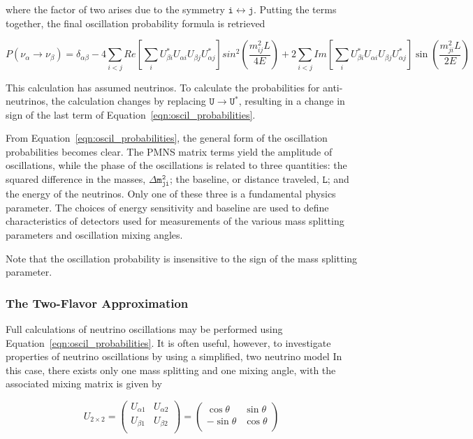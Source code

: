 where the factor of two arises due to the symmetry $\mathtt{i \leftrightarrow j}$.
Putting the terms together, the final oscillation probability formula is retrieved

\begin{equation}
P\left(\nu_\alpha\rightarrow\nu_\beta\right) = \delta_{\alpha \beta} 
	- 4 \sum_{i<j} Re\left[ \sum_i U^*_{\beta i} U_{\alpha i}  U_{\beta j} U^*_{\alpha j} \right] sin^2\left(\frac{m_{ij}^2 L}{4E}\right)
	+ 2 \sum_{i<j} Im\left[ \sum_i U^*_{\beta i} U_{\alpha i}  U_{\beta j} U^*_{\alpha j} \right] \sin\left(\frac{m_{ji}^2 L}{2E}\right)
\label{eqn:oscil_probabilities}
\end{equation}

This calculation has assumed neutrinos.
To calculate the probabilities for anti-neutrinos, the calculation changes by replacing $\mathtt{U \rightarrow U^*}$, resulting in a change in sign of the last term of Equation~\ref{eqn:oscil_probabilities}.

From Equation~\ref{eqn:oscil_probabilities}, the general form of the oscillation probabilities becomes clear. 
The PMNS matrix terms yield the amplitude of oscillations, while the phase of the oscillations is related to three quantities: the squared difference in the masses, $\mathtt{\Delta m^2_{ji}}$; the baseline, or distance traveled, $\mathtt{L}$; and the energy of the neutrinos.
Only one of these three is a fundamental physics parameter.
The choices of energy sensitivity and baseline are used to define characteristics of detectors  used for measurements of the various mass splitting parameters and oscillation mixing angles.

Note that the oscillation probability is insensitive to the sign of the mass splitting parameter.


\label{subsubsec:two_flavors}
\subsubsection{The Two-Flavor Approximation}
Full calculations of neutrino oscillations may be performed using Equation~\ref{eqn:oscil_probabilities}.
It is often useful, however, to investigate properties of neutrino oscillations by using a simplified, two neutrino model
In this case, there exists only one mass splitting and one mixing angle, with the associated mixing matrix is given by

\begin{equation}
U_{2\times 2} = 
\begin{pmatrix}
 U_{\alpha 1} & U_{\alpha 2} \\
 U_{\beta 1} & U_{\beta 2} \\
\end{pmatrix} 	=
\begin{pmatrix}
 \cos \theta & \sin \theta \\
 -\sin \theta & \cos \theta \\
\end{pmatrix}
\end{equation}

